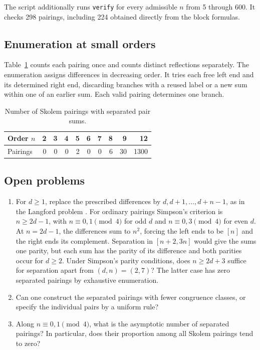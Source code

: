 \documentclass[11pt]{amsart}
\begin{document}
The script additionally runs \texttt{verify} for every
admissible \(n\) from 5 through 600. It checks 298 pairings,
including 224 obtained directly from the block formulas.

\subsection{Enumeration at small orders}

Table~\ref{tab:counts} counts each pairing once and counts
distinct reflections separately. The enumeration assigns
differences in decreasing order. It tries each free left end
and its determined right end, discarding branches with a
reused label or a new sum within one of an earlier sum.
Each valid pairing determines one branch.

\begin{table}[htbp]
\centering
\caption{Number of Skolem pairings with separated pair sums.}
\label{tab:counts}
\begin{tabular}{@{}lrrrrrrrrr@{}}
\toprule
Order \(n\)  & 2 & 3 & 4 & 5 & 6 & 7 & 8 & 9 & 12\\
\midrule
Pairings  & 0 & 0 & 0 & 2 & 0 & 0 & 6 & 30 & 1300\\
\bottomrule
\end{tabular}
\end{table}

\subsection{Open problems}

\begin{enumerate}
\item For \(d\ge1\), replace the prescribed differences by
\(d,d+1,\ldots,d+n-1\), as in the Langford problem
\cite{langford,simpson}. For ordinary pairings Simpson's
criterion is \(n\ge2d-1\), with \(n\equiv0,1\pmod4\) for
odd \(d\) and \(n\equiv0,3\pmod4\) for even \(d\).
At \(n=2d-1\), the differences sum to \(n^2\), forcing the
left ends to be \([n]\) and the right ends its complement.
Separation in \([n+2,3n]\) would give the sums one parity,
but each sum has the parity of its difference and both
parities occur for \(d\ge2\).
Under Simpson's parity conditions, does \(n\ge2d+3\)
suffice for separation apart from \((d,n)=(2,7)\)?
The latter case has zero separated pairings by exhaustive
enumeration.

\item Can one construct the separated pairings with fewer
congruence classes, or specify the individual pairs by a
uniform rule?

\item Along \(n\equiv0,1\pmod4\), what is the asymptotic
number of separated pairings? In particular, does their
proportion among all Skolem pairings tend to zero?
\end{enumerate}
\end{document}
